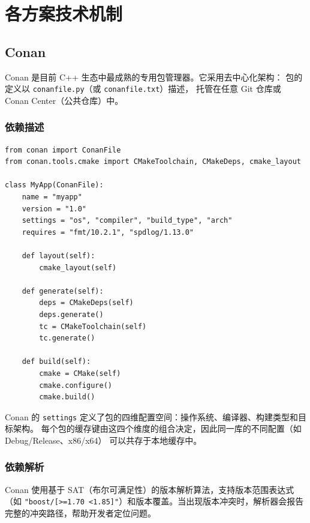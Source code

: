 \documentclass[12pt,a4paper,fontset=fandol]{ctexbook}
\begin{document}
\section{各方案技术机制}

\subsection{Conan}

Conan 是目前 C++ 生态中最成熟的专用包管理器。它采用去中心化架构：
包的定义以 \texttt{conanfile.py}（或 \texttt{conanfile.txt}）描述，
托管在任意 Git 仓库或 Conan Center（公共仓库）中。

\subsubsection*{依赖描述}

\begin{lstlisting}[language=Conan, caption={conanfile.py 示例}]
from conan import ConanFile
from conan.tools.cmake import CMakeToolchain, CMakeDeps, cmake_layout

class MyApp(ConanFile):
    name = "myapp"
    version = "1.0"
    settings = "os", "compiler", "build_type", "arch"
    requires = "fmt/10.2.1", "spdlog/1.13.0"

    def layout(self):
        cmake_layout(self)

    def generate(self):
        deps = CMakeDeps(self)
        deps.generate()
        tc = CMakeToolchain(self)
        tc.generate()

    def build(self):
        cmake = CMake(self)
        cmake.configure()
        cmake.build()
\end{lstlisting}

Conan 的 \texttt{settings} 定义了包的四维配置空间：操作系统、编译器、构建类型和目标架构。
每个包的缓存键由这四个维度的组合决定，因此同一库的不同配置（如 Debug/Release、x86/x64）
可以共存于本地缓存中。

\subsubsection*{依赖解析}

Conan 使用基于 SAT（布尔可满足性）的版本解析算法，支持版本范围表达式
（如 \texttt{"boost/[>=1.70 <1.85]"}）和版本覆盖。当出现版本冲突时，解析器会报告
完整的冲突路径，帮助开发者定位问题。
\end{document}
